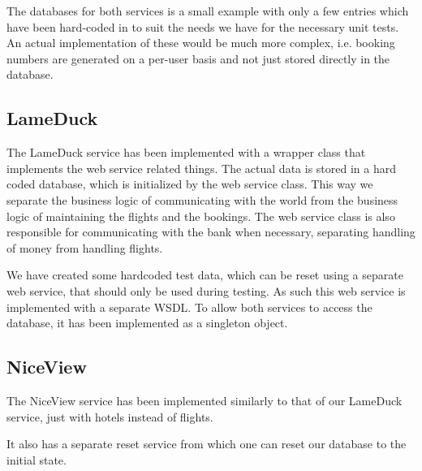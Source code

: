 The databases for both services is a small example with only a few entries which have been hard-coded in to suit the needs we have for the necessary unit tests. An actual implementation of these would be much more complex, i.e. booking numbers are generated on a per-user basis and not just stored directly in the database.

\subsection{LameDuck}
The LameDuck service has been implemented with a wrapper class that implements the web service related things. The actual data is stored in a hard coded database, which is initialized by the web service class. This way we separate the business logic of communicating with the world from the business logic of maintaining the flights and the bookings. The web service class is also responsible for communicating with the bank when necessary, separating handling of money from handling flights.

We have created some hardcoded test data, which can be reset using a separate web service, that should only be used during testing. As such this web service is implemented with a separate WSDL. To allow both services to access the database, it has been implemented as a singleton object.


\subsection{NiceView}
The NiceView service has been implemented similarly to that of our LameDuck service, just with hotels instead of flights.

It also has a separate reset service from which one can reset our database to the initial state.


